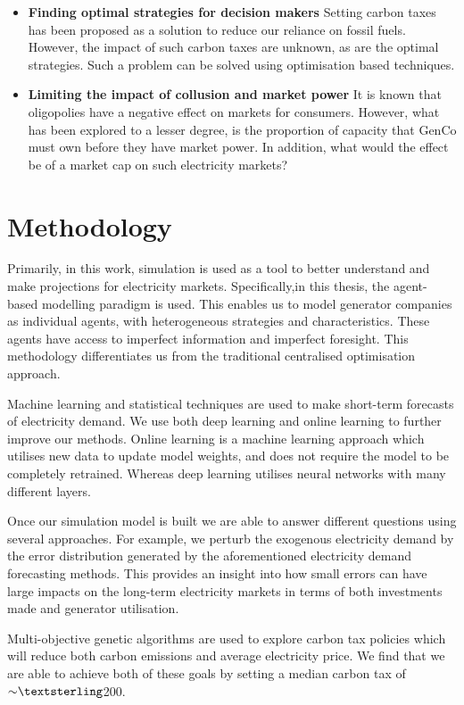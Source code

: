 \begin{itemize}
	\item \textbf{Finding optimal strategies for decision makers} Setting carbon taxes has been proposed as a solution to reduce our reliance on fossil fuels. However, the impact of such carbon taxes are unknown, as are the optimal strategies. Such a problem can be solved using optimisation based techniques.

	\item \textbf{Limiting the impact of collusion and market power} It is known that oligopolies have a negative effect on markets for consumers. However, what has been explored to a lesser degree, is the proportion of capacity that \gls{GenCo} must own before they have market power. In addition, what would the effect be of a market cap on such electricity markets? 

\end{itemize}

\section{Methodology}

Primarily, in this work, simulation is used as a tool to better understand and make projections for electricity markets. Specifically,in this thesis, the agent-based modelling paradigm is used. This enables us to model generator companies as individual agents, with heterogeneous strategies and characteristics. These agents have access to imperfect information and imperfect foresight. This methodology differentiates us from the traditional centralised optimisation approach.

Machine learning and statistical techniques are used to make short-term forecasts of electricity demand. We use both deep learning and online learning to further improve our methods. Online learning is a machine learning approach which utilises new data to update model weights, and does not require the model to be completely retrained. Whereas deep learning utilises neural networks with many different layers.

Once our simulation model is built we are able to answer different questions using several approaches. For example, we perturb the exogenous electricity demand by the error distribution generated by the aforementioned electricity demand forecasting methods. This provides an insight into how small errors can have large impacts on the long-term electricity markets in terms of both investments made and generator utilisation.

Multi-objective genetic algorithms are used to explore carbon tax policies which will reduce both carbon emissions and average electricity price. We find that we are able to achieve both of these goals by setting a median carbon tax of ${\sim}\textsterling$200.

